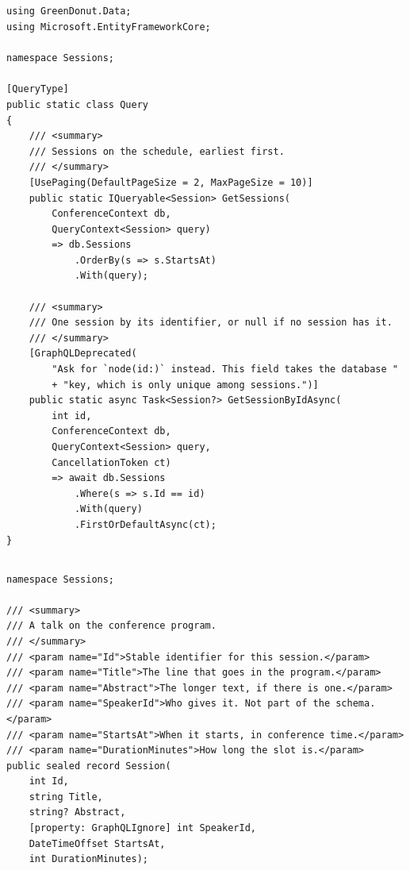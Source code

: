 \subsection*{}
\begin{verbatim}
using GreenDonut.Data;
using Microsoft.EntityFrameworkCore;

namespace Sessions;

[QueryType]
public static class Query
{
    /// <summary>
    /// Sessions on the schedule, earliest first.
    /// </summary>
    [UsePaging(DefaultPageSize = 2, MaxPageSize = 10)]
    public static IQueryable<Session> GetSessions(
        ConferenceContext db,
        QueryContext<Session> query)
        => db.Sessions
            .OrderBy(s => s.StartsAt)
            .With(query);

    /// <summary>
    /// One session by its identifier, or null if no session has it.
    /// </summary>
    [GraphQLDeprecated(
        "Ask for `node(id:)` instead. This field takes the database "
        + "key, which is only unique among sessions.")]
    public static async Task<Session?> GetSessionByIdAsync(
        int id,
        ConferenceContext db,
        QueryContext<Session> query,
        CancellationToken ct)
        => await db.Sessions
            .Where(s => s.Id == id)
            .With(query)
            .FirstOrDefaultAsync(ct);
}
\end{verbatim}

\subsection*{}
\begin{verbatim}
namespace Sessions;

/// <summary>
/// A talk on the conference program.
/// </summary>
/// <param name="Id">Stable identifier for this session.</param>
/// <param name="Title">The line that goes in the program.</param>
/// <param name="Abstract">The longer text, if there is one.</param>
/// <param name="SpeakerId">Who gives it. Not part of the schema.</param>
/// <param name="StartsAt">When it starts, in conference time.</param>
/// <param name="DurationMinutes">How long the slot is.</param>
public sealed record Session(
    int Id,
    string Title,
    string? Abstract,
    [property: GraphQLIgnore] int SpeakerId,
    DateTimeOffset StartsAt,
    int DurationMinutes);
\end{verbatim}

